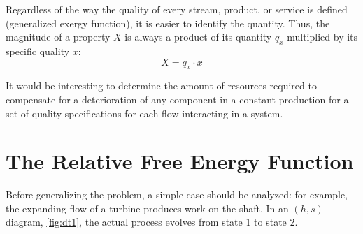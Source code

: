 \documentclass[energies,article,submit,moreauthors,pdftex]{Definitions/mdpi}
\begin{document}
Regardless of the way the quality of every stream, product, or service is defined (generalized exergy function), it is easier to identify the quantity. Thus, the magnitude of a property $X$ is always a product of its quantity $q_x$ multiplied by its specific quality $x$:
\begin{equation}
X=q_x\cdot x
\end{equation}                      

It would be interesting to determine the amount of resources required to compensate for a deterioration of any component in a constant production for a set of quality specifications for each flow interacting in a system.

\section{The Relative Free Energy Function}
Before generalizing the problem, a simple case should be analyzed: for example, the expanding flow of a turbine produces work on the shaft. In an $(h, s)$ diagram, \cref{fig:dt1}, the actual process evolves from state 1 to state 2. 
\end{document}
